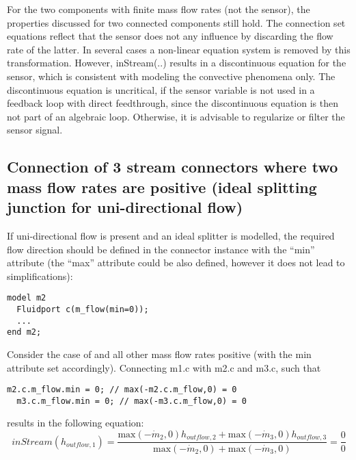 For the two components with finite mass flow rates (not the sensor), the
properties discussed for two connected components still hold. The
connection set equations reflect that the sensor does not any influence
by discarding the flow rate of the latter. In several cases a non-linear
equation system is removed by this transformation. However, inStream(..)
results in a discontinuous equation for the sensor, which is consistent
with modeling the convective phenomena only. The discontinuous equation
is uncritical, if the sensor variable is not used in a feedback loop
with direct feedthrough, since the discontinuous equation is then not
part of an algebraic loop. Otherwise, it is advisable to regularize or
filter the sensor signal.

\subsection{Connection of 3 stream connectors where two mass flow rates are positive (ideal splitting junction for uni-directional flow)}

If uni-directional flow is present and an ideal splitter is modelled,
the required flow direction should be defined in the connector instance
with the ``min'' attribute (the ``max'' attribute could be also defined,
however it does not lead to simplifications):

\begin{lstlisting}[language=modelica]
model m2
  Fluidport c(m_flow(min=0));
  ...
end m2;
\end{lstlisting}

Consider the case of and all other mass flow rates positive (with the
min attribute set accordingly). Connecting m1.c with m2.c and m3.c, such
that

\begin{lstlisting}[language=modelica]
  m2.c.m_flow.min = 0; // max(-m2.c.m_flow,0) = 0
  m3.c.m_flow.min = 0; // max(-m3.c.m_flow,0) = 0
\end{lstlisting}
results in the following equation:
\begin{equation*}
inStream(h_{outflow,1})=\frac{\text{max}(-\dot{m}_2,0)h_{outflow,2}+\text{max}(-\dot{m}_3,0)h_{outflow,3}}{\text{max}(-\dot{m}_2,0)+\text{max}(-\dot{m}_3,0)}=\frac{0}{0}
\end{equation*}

